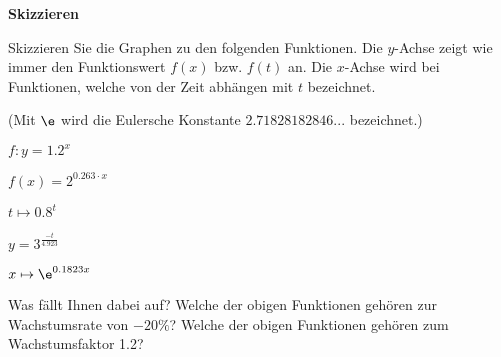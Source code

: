 \TNTeop{}


\newpage
\bbwActAufgabenNr{} \textbf{Skizzieren}

Skizzieren Sie die Graphen zu den folgenden Funktionen. Die $y$-Achse
zeigt wie immer den Funktionswert $f(x)$ bzw. $f(t)$ an. Die $x$-Achse
wird bei Funktionen, welche von der Zeit abhängen mit $t$ bezeichnet.

(Mit $\e$ wird die Eulersche Konstante $2.71828182846...$ bezeichnet.)

\begin{bbwAufgabenBlock}
\item $f: y=1.2^x$
\item $f(x) = 2^{0.263\cdot{}x}$
\item $t\mapsto{} 0.8^t$
\item $y=3^{\frac{-t}{4.923}}$
\item $x\mapsto \e^{0.1823x}$
\end{bbwAufgabenBlock}

Was fällt Ihnen dabei auf? Welche der obigen Funktionen gehören zur
Wachstumsrate von $-20\%$? Welche der obigen Funktionen gehören zum
Wachstumsfaktor 1.2?




\newpage
